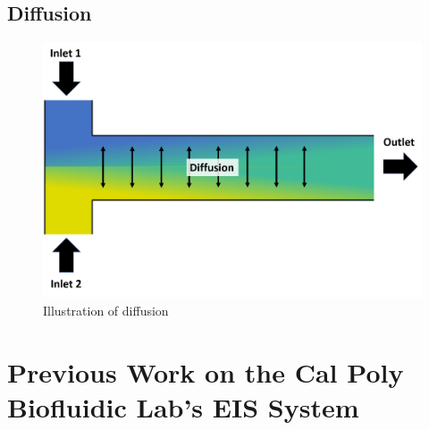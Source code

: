 \subsection*{Diffusion}

\begin{figure}[ht]
    \centering
    \includegraphics[width=\textwidth]{images/diffusion_illustration.png}
    \caption{Illustration of diffusion}
    \label{fig:diffusion_ilustration}
\end{figure} 



 \section{Previous Work on the Cal Poly Biofluidic Lab's EIS System}
 
 
